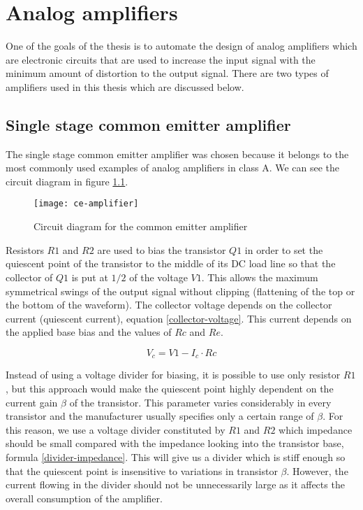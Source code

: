 \chapter{Analog amplifiers}
One of the goals of the thesis is to automate the design of analog amplifiers which are electronic circuits that are used to increase the input signal with the minimum amount of distortion to the output signal. There are two types of amplifiers used in this thesis which are discussed below.

\section{Single stage common emitter amplifier} \label{ce-amp}
The single stage common emitter amplifier was chosen because it belongs to the most commonly used examples of analog amplifiers in class A. We can see the circuit diagram in figure \ref{ce-amplifier}.

\begin{figure}[H]
    \centering
    \texttt{[image: ce-amplifier]}\label{ce-amplifier}
    \caption{Circuit diagram for the common emitter amplifier}
\end{figure}

Resistors $R1$ and $R2$ are used to bias the transistor $Q1$ in order to set the quiescent point of the transistor to the middle of its DC load line so that the collector of $Q1$ is put at $1/2$ of the voltage $V1$. This allows the maximum symmetrical swings of the output signal without clipping (flattening of the top or the bottom of the waveform). The collector voltage depends on the collector current (quiescent current), equation \ref{collector-voltage}. This current depends on the applied base bias and the values of $Rc$ and $Re$.

\begin{equation} \label{collector-voltage}
    V_c = V1 - I_c \cdot Rc
\end{equation}

Instead of using a voltage divider for biasing, it is possible to use only resistor $R1$, but this approach would make the quiescent point highly dependent on the current gain $\beta$ of the transistor. This parameter varies considerably in every transistor and the manufacturer usually specifies only a certain range of $\beta$. For this reason, we use a voltage divider constituted by $R1$ and $R2$ which impedance should be small compared with the impedance looking into the transistor base, formula \ref{divider-impedance}. This will give us a divider which is stiff enough so that the quiescent point is insensitive to variations in transistor $\beta$. However, the current flowing in the divider should not be unnecessarily large as it affects the overall consumption of the amplifier.

